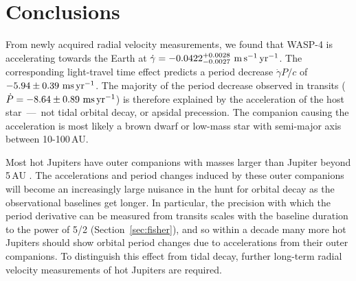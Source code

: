 \documentclass[12pt,twocolumn,tighten]{aastex62}
\begin{document}
\section{Conclusions}
\label{sec:conclusions}

From newly acquired radial velocity measurements, we found that WASP-4
is accelerating towards the Earth at $\dot{\gamma} =
-0.0422^{+0.0028}_{-0.0027}\ {\rm m}\,{\rm s}^{-1}\,{\rm yr}^{-1}$.
The corresponding light-travel time effect predicts a period decrease
$\dot{\gamma} P/c$ of $-5.94 \pm 0.39~{\rm ms}\,{\rm yr}^{-1}$.  The
majority of the period decrease observed in transits ($\dot{P}= - 8.64
\pm 0.89~{\rm ms}\,{\rm yr}^{-1}$) is therefore explained by the
acceleration of the host star~---~not tidal orbital decay, or apsidal
precession.  The companion causing the acceleration is most likely a
brown dwarf or low-mass star with semi-major axis between
10-100$\,$AU.

Most hot Jupiters have outer companions with masses larger than
Jupiter beyond 5$\,$AU
\citep{knutson_friends_2014,bryan_statistics_2016}. The accelerations
and period changes induced by these outer companions will become an
increasingly large nuisance in the hunt for orbital decay as the
observational baselines get longer.  In particular, the precision with
which the period derivative can be measured from transits scales with
the baseline duration to the power of 5/2 (Section~\ref{sec:fisher}), and
so within a decade many more hot Jupiters should show orbital period
changes due to accelerations from their outer companions.  
To distinguish this effect from tidal decay, further long-term radial
velocity measurements of hot Jupiters are required.

\end{document}

